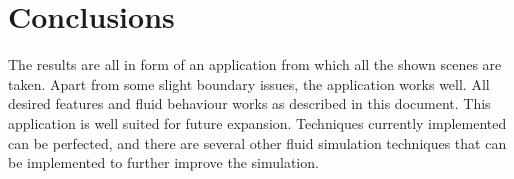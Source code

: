 \chapter{Conclusions}
The results are all in form of an application from which all the shown scenes are taken. Apart from some slight boundary issues, the application works well. All desired features and fluid behaviour works as described in this document. 
This application is well suited for future expansion. Techniques currently implemented can be perfected, and there are several other fluid simulation techniques that can be implemented to further improve the simulation.
